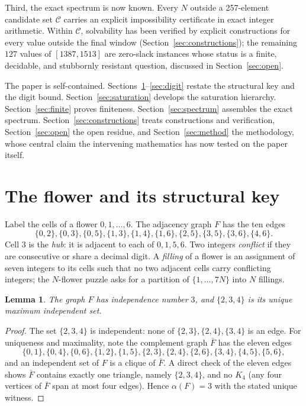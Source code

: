 \documentclass[11pt]{article}
\newtheorem{lemma}{Lemma}
\theoremstyle{definition}
\theoremstyle{remark}
\begin{document}
Third, the exact spectrum is now known. Every $N$ outside a 257-element candidate set $\mathcal{C}$ carries an explicit impossibility certificate in exact integer arithmetic. Within $\mathcal{C}$, solvability has been verified by explicit constructions for every value outside the final window (Section~\ref{sec:constructions}); the remaining $127$ values of $[1387,1513]$ are zero-slack instances whose status is a finite, decidable, and stubbornly resistant question, discussed in Section~\ref{sec:open}.

The paper is self-contained. Sections~\ref{sec:flower}--\ref{sec:digit} restate the structural key and the digit bound. Section~\ref{sec:saturation} develops the saturation hierarchy. Section~\ref{sec:finite} proves finiteness. Section~\ref{sec:spectrum} assembles the exact spectrum. Section~\ref{sec:constructions} treats constructions and verification, Section~\ref{sec:open} the open residue, and Section~\ref{sec:method} the methodology, whose central claim the intervening mathematics has now tested on the paper itself.

\section{The flower and its structural key}\label{sec:flower}

Label the cells of a flower $0,1,\dots,6$. The adjacency graph $F$ has the ten edges
\[
\{0,2\},\{0,3\},\{0,5\},\{1,3\},\{1,4\},\{1,6\},\{2,5\},\{3,5\},\{3,6\},\{4,6\}.
\]
Cell $3$ is the \emph{hub}: it is adjacent to each of $0,1,5,6$. Two integers \emph{conflict} if they are consecutive or share a decimal digit. A \emph{filling} of a flower is an assignment of seven integers to its cells such that no two adjacent cells carry conflicting integers; the $N$-flower puzzle asks for a partition of $\{1,\dots,7N\}$ into $N$ fillings.

\begin{lemma}\label{lem:key}
The graph $F$ has independence number $3$, and $\{2,3,4\}$ is its unique maximum independent set.
\end{lemma}

\begin{proof}
The set $\{2,3,4\}$ is independent: none of $\{2,3\},\{2,4\},\{3,4\}$ is an edge. For uniqueness and maximality, note the complement graph $\bar F$ has the eleven edges
\[
\{0,1\},\{0,4\},\{0,6\},\{1,2\},\{1,5\},\{2,3\},\{2,4\},\{2,6\},\{3,4\},\{4,5\},\{5,6\},
\]
and an independent set of $F$ is a clique of $\bar F$. A direct check of the eleven edges shows $\bar F$ contains exactly one triangle, namely $\{2,3,4\}$, and no $K_4$ (any four vertices of $\bar F$ span at most four edges). Hence $\alpha(F)=3$ with the stated unique witness.
\end{proof}
\end{document}
